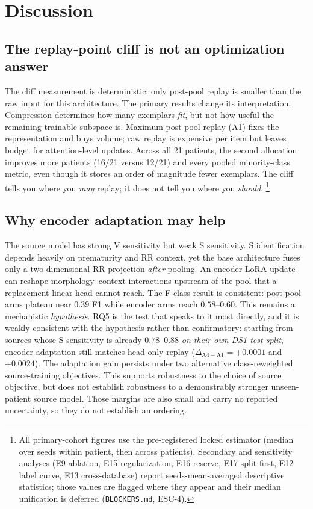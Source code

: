 \section{Discussion}
\label{sec:discussion}

\subsection{The replay-point cliff is not an optimization answer}

The cliff measurement is deterministic: only post-pool replay is smaller than
the raw input for this architecture. The primary results change its
interpretation. Compression determines how many exemplars \emph{fit}, but not
how useful the remaining trainable subspace is. Maximum post-pool replay (A1)
fixes the representation and buys volume; raw replay is expensive per item but
leaves budget for attention-level updates. Across all 21 patients, the second
allocation improves more patients (16/21 versus 12/21) and every pooled
minority-class metric, even though it stores an order of magnitude fewer
exemplars. The cliff tells you where you \emph{may} replay; it does not tell you
where you \emph{should}.
\footnote{All primary-cohort figures use the pre-registered locked estimator
(median over seeds within patient, then across patients). Secondary and
sensitivity analyses (E9 ablation, E15 regularization, E16 reserve, E17
split-first, E12 label curve, E13 cross-database) report seeds-mean-averaged
descriptive statistics; those values are flagged where they appear and their
median unification is deferred (\texttt{BLOCKERS.md}, ESC-4).}

\subsection{Why encoder adaptation may help}

The source model has strong V sensitivity but weak S sensitivity. S
identification depends heavily on prematurity and RR context, yet the base
architecture fuses only a two-dimensional RR projection \emph{after} pooling. An
encoder LoRA update can reshape morphology--context interactions upstream of the
pool that a replacement linear head cannot reach. The F-class result is
consistent: post-pool arms plateau near $0.39$ F1 while encoder arms reach
$0.58$--$0.60$. This remains a mechanistic \emph{hypothesis}. RQ5 is the test that
speaks to it most directly, and it is weakly consistent with the hypothesis
rather than confirmatory: starting from sources whose S sensitivity is already
$0.78$--$0.88$ \emph{on their own DS1 test split}, encoder adaptation still
matches head-only replay ($\Delta_{\mathrm{A4-A1}} = +0.0001$ and $+0.0024$).
The adaptation gain persists under two alternative class-reweighted
source-training objectives. This supports robustness to the choice of source
objective, but does not establish robustness to a demonstrably stronger
unseen-patient source model. Those margins are also small and carry no
reported uncertainty, so they do not establish an ordering.

